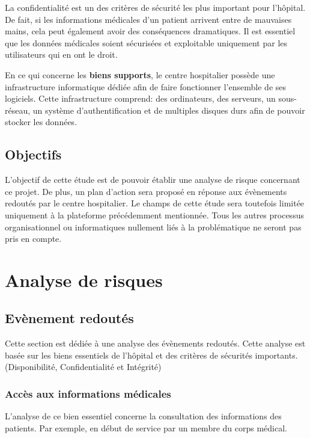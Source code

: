 \documentclass[12pt]{article}
\begin{document}
\justify
La confidentialité est un des critères de sécurité les plus important pour l'hôpital. De fait, si les informations médicales d'un patient arrivent entre de mauvaises mains, cela peut également avoir des conséquences dramatiques. Il est essentiel que les données médicales soient sécurisées et exploitable uniquement par les utilisateurs qui en ont le droit.

\justify
En ce qui concerne les \textbf{biens supports}, le centre hospitalier possède une infrastructure informatique dédiée afin de faire fonctionner l'ensemble de ses logiciels. Cette infrastructure comprend: des ordinateurs, des serveurs, un sous-réseau, un système d'authentification et de multiples disques durs afin de pouvoir stocker les données.

\subsection{Objectifs}

\justify
L'objectif de cette étude est de pouvoir établir une analyse de risque concernant ce projet. De plus, un plan d'action sera proposé en réponse aux évènements redoutés par le centre hospitalier. Le champs de cette étude sera toutefois limitée uniquement à la plateforme précédemment mentionnée. Tous les autres processus organisationnel ou informatiques nullement liés à la problématique ne seront pas pris en compte.

\section{Analyse de risques}

\subsection{Evènement redoutés}

Cette section est dédiée à une analyse des évènements redoutés. Cette analyse est basée sur les biens essentiels de l'hôpital et des critères de sécurités importants. (Disponibilité, Confidentialité et Intégrité)

\subsubsection{Accès aux informations médicales}

L'analyse de ce bien essentiel concerne la consultation des informations des patients. Par exemple, en début de service par un membre du corps médical.
\end{document}
